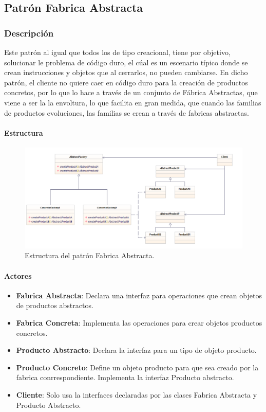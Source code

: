 \subsection{Patrón Fabrica Abstracta}
\subsubsection{Descripción}
Este patrón al igual que todos los de tipo creacional, tiene por objetivo, solucionar le problema de código duro, el cúal es un escenario típico donde se crean instrucciones y objetos que al cerrarlos, no pueden cambiarse.
En dicho patrón, el cliente no quiere caer en código duro para la creación de productos concretos, por lo que lo hace a través de un conjunto de Fábrica Abstractas, que viene a ser la la envoltura, lo que facilita en gran medida, que cuando las familias de productos evoluciones, las familias se crean a través de fabricas abstractas.

\paragraph{Estructura}

\begin{figure}[th!]
	\centering
	\includegraphics[width=.9\linewidth]{imagenes/Patrones/Fabrica.pdf}
	\caption{Estructura del patrón Fabrica Abstracta.\cite{gof}}	
\end{figure}

\paragraph{Actores}

\begin{itemize}
	\item \textbf{Fabrica Abstracta}: Declara una interfaz para operaciones que crean objetos de productos abstractos.
	\item \textbf{Fabrica Concreta}: Implementa las operaciones para crear objetos productos concretos.
	\item \textbf{Producto Abstracto}: Declara la interfaz para un tipo de objeto producto.
	\item \textbf{Producto Concreto}: Define un objeto producto para que sea creado por la fabrica conrrespondiente. Implementa la interfaz Producto abstracto.
	\item \textbf{Cliente}: Solo usa la interfaces declaradas por las clases Fabrica Abstracta y Producto Abstracto.
	
\end{itemize}


